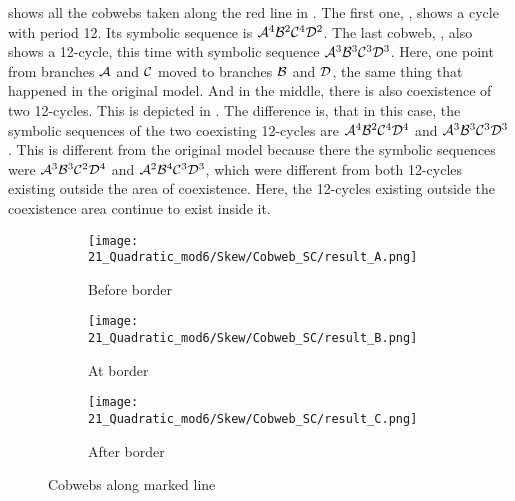  shows all the cobwebs taken along the red line in .
The first one, , shows a cycle with period 12.
Its symbolic sequence is $\mathcal{A}^4\mathcal{B}^2\mathcal{C}^4\mathcal{D}^2$.
The last cobweb, , also shows a 12-cycle, this time with symbolic sequence $\mathcal{A}^3\mathcal{B}^3\mathcal{C}^3\mathcal{D}^3$.
Here, one point from branches $\mathcal{A}$ and $\mathcal{C}$ moved to branches $\mathcal{B}$ and $\mathcal{D}$, the same thing that happened in the original model.
And in the middle, there is also coexistence of two 12-cycles.
This is depicted in .
The difference is, that in this case, the symbolic sequences of the two coexisting 12-cycles are $\mathcal{A}^4\mathcal{B}^2\mathcal{C}^4\mathcal{D}^4$ and $\mathcal{A}^3\mathcal{B}^3\mathcal{C}^3\mathcal{D}^3$.
This is different from the original model because there the symbolic sequences were $\mathcal{A}^3\mathcal{B}^3\mathcal{C}^2\mathcal{D}^4$ and $\mathcal{A}^2\mathcal{B}^4\mathcal{C}^3\mathcal{D}^3$, which were different from both 12-cycles existing outside the area of coexistence.
Here, the 12-cycles existing outside the coexistence area continue to exist inside it.

\begin{figure}
    \centering
    \begin{subfigure}{0.3\textwidth}
        \centering
        \texttt{[image: 21\_Quadratic\_mod6/Skew/Cobweb\_SC/result\_A.png]}
        \caption{Before border}
        \label{fig:quad.full.skew.c.CobwebA}
    \end{subfigure}
    \begin{subfigure}{0.3\textwidth}
        \centering
        \texttt{[image: 21\_Quadratic\_mod6/Skew/Cobweb\_SC/result\_B.png]}
        \caption{At border}
        \label{fig:quad.full.skew.c.CobwebB}
    \end{subfigure}
    \begin{subfigure}{0.3\textwidth}
        \centering
        \texttt{[image: 21\_Quadratic\_mod6/Skew/Cobweb\_SC/result\_C.png]}
        \caption{After border}
        \label{fig:quad.full.skew.c.CobwebC}
    \end{subfigure}
    \caption{Cobwebs along marked line}
    \label{fig:quad.full.skew.c.Cobwebs}
\end{figure}

